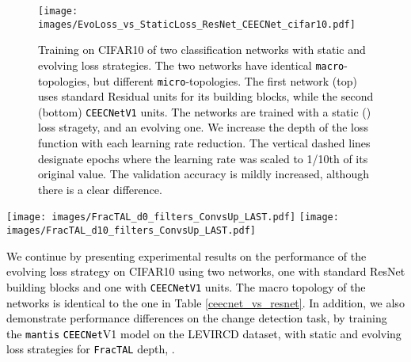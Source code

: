 \documentclass[times, 5p]{elsarticle}
\def \FracTAL {\texttt{FracTAL} }
\newcommand{\ceecnet}{\texttt{CEECNet}}
\newcommand{\mantis}{\texttt{mantis}}
\begin{document}
\begin{figure}
\centering
\texttt{[image: images/EvoLoss\_vs\_StaticLoss\_ResNet\_CEECNet\_cifar10.pdf]}
\caption{\textcolor{black}{Training on CIFAR10 of two classification networks with static and evolving loss strategies. The two networks have  identical \texttt{macro}-topologies, but  different \texttt{micro}-topologies. The first network (top) uses standard Residual units for its building blocks, while the second (bottom) \texttt{CEECNetV1} units. The networks are trained with a static  () loss stragety, and an evolving one. We increase the depth  of the   loss function with each learning rate reduction. The vertical dashed lines designate epochs where the learning rate was scaled to 1/10th of its original value. The validation accuracy is mildly increased, although there is a clear difference.}}
\label{EvolvingLoss_cifar10}
\end{figure}


\begin{figure*}
\centering
\texttt{[image: images/FracTAL\_d0\_filters\_ConvsUp\_LAST.pdf]}
\texttt{[image: images/FracTAL\_d10\_filters\_ConvsUp\_LAST.pdf]}
\caption{\textcolor{black}{Visualization of the last features (before the multitasking head) for the \mantis{}\FracTAL \texttt{ResNet} models of \FracTAL depth  (left pannel) and  (right pannel). The features appear similar. For each panel the top left first three images are the input image at date , the input image at date  and the ground truth mask.}} 
\label{FracTAL_d0_vs_d10_bfr_head}
\end{figure*}


\textcolor{black}{
We continue by presenting experimental results on the performance of the evolving  loss strategy on \textsc{CIFAR10} using two networks, one with  standard  ResNet building blocks and one with  \ceecnet \texttt{V1} units. The macro topology of the  networks is identical to the one in Table \ref{ceecnet_vs_resnet}. In addition, we also demonstrate performance differences on the change detection task, by training the \mantis {} \ceecnet V1 model on the LEVIRCD dataset, with static and evolving loss strategies for \FracTAL depth, .} 
\end{document}
